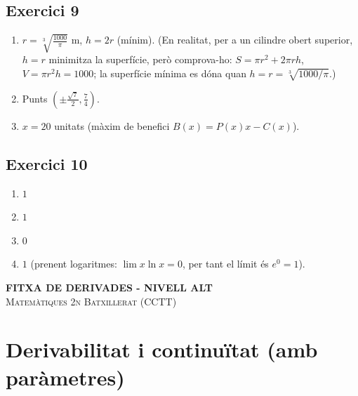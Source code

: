 \documentclass[12pt]{article}
\begin{document}
\subsection*{Exercici 9}
\begin{enumerate}[label=\alph*)]
    \item $r=\sqrt[3]{\frac{1000}{\pi}}$ m, $h=2r$ (mínim). (En realitat, per a un cilindre obert superior, $h=r$ minimitza la superfície, però comprova-ho: $S=\pi r^2+2\pi r h$, $V=\pi r^2 h=1000$; la superfície mínima es dóna quan $h=r=\sqrt[3]{1000/\pi}$.)
    \item Punts $\left(\pm\frac{\sqrt{7}}{2},\frac{7}{4}\right)$.
    \item $x=20$ unitats (màxim de benefici $B(x)=P(x)x-C(x)$).
\end{enumerate}

\subsection*{Exercici 10}
\begin{enumerate}[label=\alph*)]
    \item $1$
    \item $1$
    \item $0$
    \item $1$ (prenent logaritmes: $\lim x\ln x=0$, per tant el límit és $e^0=1$).
\end{enumerate}



\newpage

\begin{center}
    {\Large \textbf{FITXA DE DERIVADES - NIVELL ALT}} \\
    \vspace{0.2cm}
    \textsc{Matemàtiques 2n Batxillerat (CCTT)}
\end{center}

\vspace{0.5cm}

\section*{Derivabilitat i continuïtat (amb paràmetres)}
\end{document}
